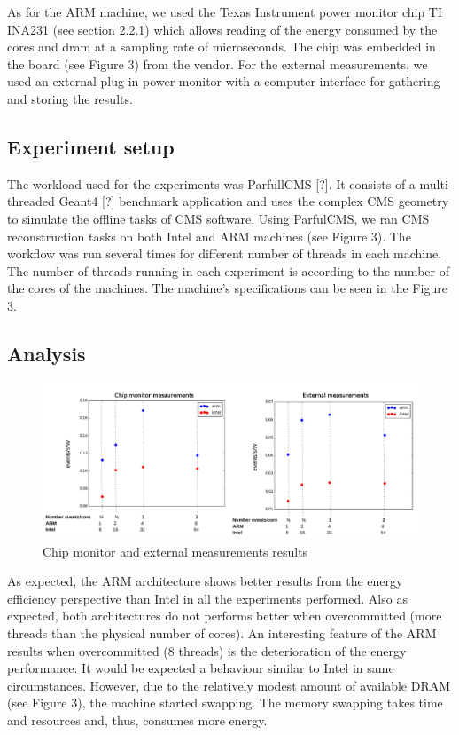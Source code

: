 \documentclass[a4paper]{jpconf}
\begin{document}
As for the ARM machine, we used the Texas Instrument power monitor chip 
TI INA231 (see section 2.2.1) which allows reading of the energy consumed by the
cores and dram at a sampling rate of microseconds. The chip was embedded in the 
board (see Figure 3) from the vendor. For the external measurements, we used
an external plug-in power monitor with a computer interface for gathering and
storing the results.

\subsection{Experiment setup}
The workload used for the experiments was ParfullCMS [?]. It consists
of a multi-threaded Geant4 [?] benchmark application and uses the complex
CMS geometry to simulate the offline tasks of CMS software. Using ParfulCMS, 
we ran CMS reconstruction tasks
on both Intel and ARM machines (see Figure 3). The workflow was run several
times for different number of threads in each machine. The number of threads
running in each experiment is according to the number of the cores of the
machines. The machine's specifications can be seen in the Figure 3. 

\subsection{Analysis}

\begin{figure}[H]
\centering
\includegraphics[width=170mm]{img/results1.png}
\caption{Chip monitor and external measurements results}
\label{overflow}
\end{figure}

As expected, the ARM architecture shows better results from the energy efficiency
 perspective than Intel in all the experiments performed. Also as expected, both 
architectures do not performs better when overcommitted (more threads than the
physical number of cores). An interesting feature of the ARM results when 
overcommitted (8 threads) is the deterioration of the energy performance. It
would be expected a behaviour similar to Intel in same circumstances. However, due
to the relatively modest amount of available DRAM (see Figure 3), the machine
started swapping. The memory swapping takes time and resources and, thus, 
consumes more energy.
\end{document}
